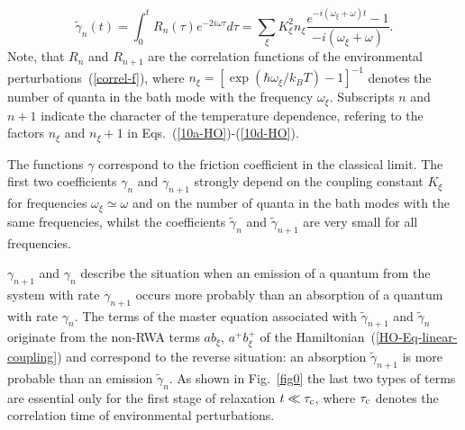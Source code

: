 \documentclass[12pt,twoside,a4paper]{report}
\begin{document}
\begin{equation}
\tilde{\gamma} _n(t)
           =\int_0^tR_n(\tau ) e^{-2{{i}}\omega \tau}d\tau
           =\sum_\xi K_\xi ^2 n_\xi
                 \frac
                      {e^{-{{i}}(\omega _\xi +\omega )t}-1}
                      {-{{i}}(\omega _\xi +\omega )}. 
\label{10d-HO}
\end{equation}
Note, that $R_n$ and $R_{n+1}$ are the correlation functions of the
environmental perturbations~(\ref{correl-f}),
where
$n
 _\xi 
       =
          [\exp{(\hbar\omega_\xi/k_B T)}-1]^{-1}$ 
denotes the number of
quanta in the bath mode with the frequency $\omega_\xi$.  
Subscripts $n$ and $n+1$ indicate the character 
of the temperature dependence, refering to the factors
$n_\xi$ and $n_\xi + 1$ in Eqs.~(\ref{10a-HO})-(\ref{10d-HO}).




The functions $\gamma$ correspond to the friction coefficient in the
classical limit.  The first two coefficients $\gamma_n$ and
$\gamma_{n+1}$ strongly depend on the coupling constant $K_\xi$ for
frequencies $\omega _\xi \simeq \omega $ and on the number of quanta
in the bath modes with the same frequencies, whilst the coefficients
$\tilde{\gamma}_n$ and $\tilde{\gamma}_{n+1}$ are very small for all
frequencies.

$\gamma_{n+1}$ and $\gamma_n$ describe the
situation when an emission of a quantum from the system with rate $\gamma_{n+1}$
occurs more probably than an absorption of a quantum with rate $\gamma_n$.  The
terms of the master equation associated with $\tilde \gamma_{n+1}$ and
$\tilde \gamma_n$ originate from the non-RWA terms $ab_\xi$,
$a^+b_\xi^+$ of the Hamiltonian~(\ref{HO-Eq-linear-coupling}) and correspond to the
reverse situation: an absorption $\tilde \gamma_{n+1}$ is  more probable than
an emission $\tilde \gamma_n$. As shown in Fig.~\ref{fig0} the last two
types of terms are essential only for the first stage of relaxation
$t\ll\tau_{\rm c}$, where $\tau_{\rm c}$ denotes the correlation time
of environmental perturbations.
\end{document}
